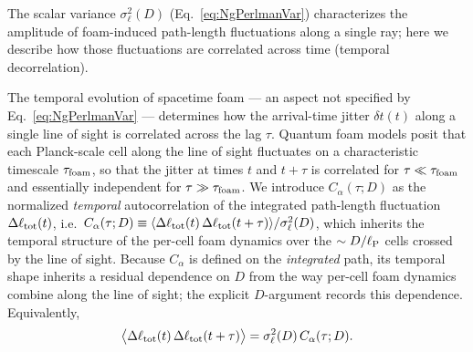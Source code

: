 \documentclass[aps,prd,onecolumn,amsmath,amssymb]{revtex4-2}
\begin{document}
The scalar variance $\sigma_\ell^2(D)$ (Eq.~\eqref{eq:NgPerlmanVar})
characterizes the amplitude of foam-induced path-length fluctuations along
a single ray; here we describe how those fluctuations are correlated
across time (temporal decorrelation).

The temporal evolution of spacetime foam --- an aspect not specified by
Eq.~\eqref{eq:NgPerlmanVar} --- determines how the arrival-time jitter
$\delta t(t)$ along a single line of sight is correlated across the lag $\tau$.
Quantum foam models posit that each Planck-scale cell along the line of sight
fluctuates on a characteristic timescale $\tau_{\rm foam}$, so that the jitter
at times $t$ and $t+\tau$ is correlated for $\tau \ll \tau_{\rm foam}$ and
essentially independent for $\tau \gg \tau_{\rm foam}$.
We introduce $C_\alpha(\tau;D)$ as the normalized \emph{temporal}
autocorrelation of the integrated path-length fluctuation
$\Delta\ell_{\rm tot}(t)$, i.e.\ $C_\alpha(\tau;D) \equiv
\langle\Delta\ell_{\rm tot}(t)\,\Delta\ell_{\rm tot}(t+\tau)\rangle
/\sigma_\ell^2(D)$, which inherits the temporal structure of the
per-cell foam dynamics over the $\sim D/\ell_{\rm P}$ cells crossed by
the line of sight.
Because $C_\alpha$ is defined on the \emph{integrated} path, its
temporal shape inherits a residual dependence on $D$ from the way
per-cell foam dynamics combine along the line of sight; the explicit
$D$-argument records this dependence.
Equivalently,
\begin{equation}
  \big\langle \Delta\ell_{\rm tot}(t)\,
              \Delta\ell_{\rm tot}(t+\tau) \big\rangle
  = \sigma_\ell^2(D)\,C_\alpha(\tau;D).
  \label{eq:pathcov1ray}
\end{equation}
\end{document}
